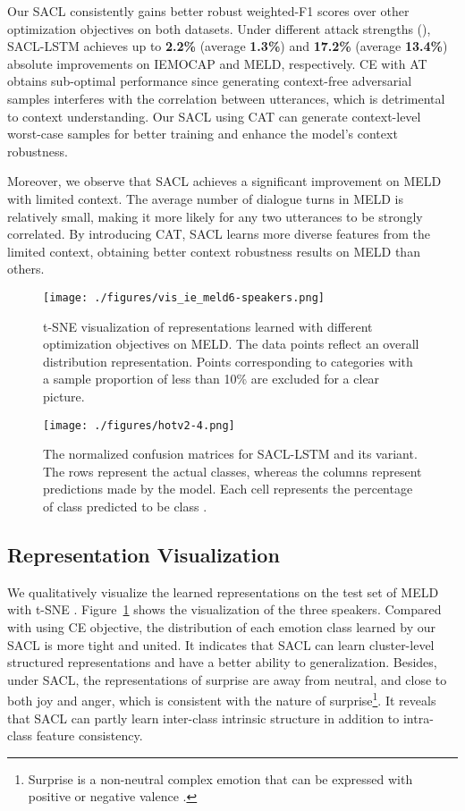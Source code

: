 \documentclass[11pt]{article}
\begin{document}
Our SACL consistently gains better robust weighted-F1 scores over other optimization objectives on both datasets. 
Under different attack strengths (), SACL-LSTM achieves up to \textbf{2.2\%} (average  \textbf{1.3\%}) and \textbf{17.2\%} (average \textbf{13.4\%}) absolute improvements on IEMOCAP and MELD, respectively.
CE with AT obtains sub-optimal performance 
since generating context-free adversarial samples interferes with the correlation between utterances, which is detrimental to context understanding.
Our SACL using CAT can generate context-level worst-case samples for better training and enhance the model's context robustness.

Moreover, we observe that SACL achieves a significant improvement on MELD with limited context.
The average number of dialogue turns in MELD is relatively small, making it more likely for any two utterances to be strongly correlated. 
By introducing CAT, SACL learns more diverse features from the limited context, obtaining better context robustness results on MELD than others.

\begin{figure}[t]
  \centering
    \texttt{[image: ./figures/vis\_ie\_meld6-speakers.png]}
    \caption{
    t-SNE visualization of representations learned with different optimization objectives on MELD. The data points reflect an overall distribution representation.
    Points corresponding to categories with a sample proportion of less than 10\% are excluded for a clear picture. 
}
  \label{fig:vis}
\end{figure}


\begin{figure}
  \centering
    \texttt{[image: ./figures/hotv2-4.png]}
    \caption{The normalized confusion matrices for SACL-LSTM and its variant.
    The rows represent the actual classes, whereas the columns represent predictions made by the model. 
    Each cell  represents the percentage of class  predicted to be class .
    }
  \label{fig:confusion}
\end{figure}


\subsection{Representation Visualization}
We qualitatively visualize the learned representations on the test set of MELD with t-SNE \cite{van2008visualizing}. 
Figure~\ref{fig:vis} shows the visualization of the three speakers. 
Compared with using CE objective, the distribution of each emotion class learned by our SACL is more tight and united.
It indicates that SACL can learn cluster-level structured representations and have a better ability to generalization. 
Besides, under SACL, the representations of surprise are away from neutral, and close to both joy and anger, which is consistent with the nature of surprise\footnote{Surprise is a non-neutral complex emotion that can be expressed with positive or negative valence \cite{DBLP:conf/acl/PoriaHMNCM19}.}.
It reveals that SACL can partly learn inter-class intrinsic structure in addition to intra-class feature consistency.
\end{document}
